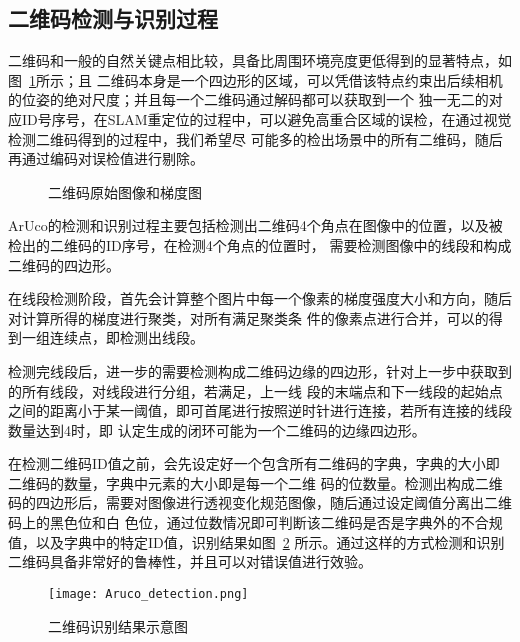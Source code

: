 \subsection{二维码检测与识别过程}
\label{sec:2.2.1}
二维码和一般的自然关键点相比较，具备比周围环境亮度更低得到的显著特点，如图~\ref{fig:Aruco_Aruco_Gradient}所示；且
二维码本身是一个四边形的区域，可以凭借该特点约束出后续相机的位姿的绝对尺度；并且每一个二维码通过解码都可以获取到一个
独一无二的对应ID号序号，在SLAM重定位的过程中，可以避免高重合区域的误检，在通过视觉检测二维码得到的过程中，我们希望尽
可能多的检出场景中的所有二维码，随后再通过编码对误检值进行剔除。
\begin{figure}[H]
  \centering%
  \hspace{4em}%
  \caption{二维码原始图像和梯度图}
  \label{fig:Aruco_Aruco_Gradient}
\end{figure}

ArUco的检测和识别过程主要包括检测出二维码4个角点在图像中的位置，以及被检出的二维码的ID序号，在检测4个角点的位置时，
需要检测图像中的线段和构成二维码的四边形。

在线段检测阶段，首先会计算整个图片中每一个像素的梯度强度大小和方向，随后对计算所得的梯度进行聚类，对所有满足聚类条
件的像素点进行合并，可以的得到一组连续点，即检测出线段。

检测完线段后，进一步的需要检测构成二维码边缘的四边形，针对上一步中获取到的所有线段，对线段进行分组，若满足，上一线
段的末端点和下一线段的起始点之间的距离小于某一阈值，即可首尾进行按照逆时针进行连接，若所有连接的线段数量达到4时，即
认定生成的闭环可能为一个二维码的边缘四边形。

在检测二维码ID值之前，会先设定好一个包含所有二维码的字典，字典的大小即二维码的数量，字典中元素的大小即是每一个二维
码的位数量。检测出构成二维码的四边形后，需要对图像进行透视变化规范图像，随后通过设定阈值分离出二维码上的黑色位和白
色位，通过位数情况即可判断该二维码是否是字典外的不合规值，以及字典中的特定ID值，识别结果如图~\ref{fig:Aruco_detection}
所示。通过这样的方式检测和识别二维码具备非常好的鲁棒性，并且可以对错误值进行效验。
\begin{figure}[H] %
  \centering
  \texttt{[image: Aruco\_detection.png]}
  \caption{二维码识别结果示意图}
  \label{fig:Aruco_detection}
\end{figure}

